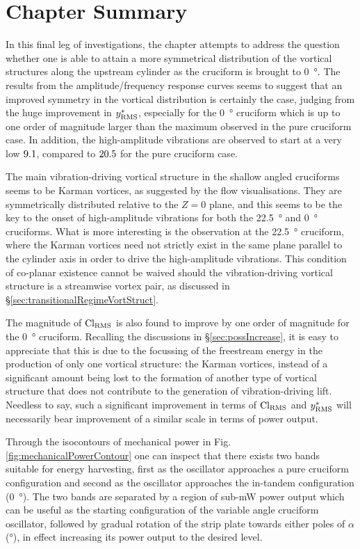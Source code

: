 \documentclass[oneside]{utmthesis}
\begin{document}
\section{Chapter Summary} \label{sec:chapSumShallow}
In this final leg of investigations, the chapter attempts to address the question whether one is able to attain a more symmetrical distribution of the vortical structures along the upstream cylinder as the cruciform is brought to \SI{0}{\degree}. The results from the amplitude/frequency response curves seems to suggest that an improved symmetry in the vortical distribution is certainly the case, judging from the huge improvement in $y^{*}_{\text{RMS}}$, especially for the \SI{0}{\degree} cruciform which is up to one order of magnitude larger than the maximum observed in the pure cruciform case. In addition, the high-amplitude vibrations are observed to start at a very low $9.1$, compared to $20.5$ for the pure cruciform case.

The main vibration-driving vortical structure in the shallow angled cruciforms seems to be Karman vortices, as suggested by the flow visualisations. They are symmetrically distributed relative to the $Z=0$ plane, and this seems to be the key to the onset of high-amplitude vibrations for both the \SI{22.5}{\degree} and \SI{0}{\degree} cruciforms. What is more interesting is the observation at the \SI{22.5}{\degree} cruciform, where the Karman vortices need not strictly exist in the same plane parallel to the cylinder axis in order to drive the high-amplitude vibrations. This condition of co-planar existence cannot be waived should the vibration-driving vortical structure is a streamwise vortex pair, as discussed in \S\ref{sec:transitionalRegimeVortStruct}.

The magnitude of $\text{Cl}_{\text{RMS}}$ is also found to improve by one order of magnitude for the \SI{0}{\degree} cruciform. Recalling the discussions in \S\ref{sec:possIncrease}, it is easy to appreciate that this is due to the focussing of the freestream energy in the production of only one vortical structure: the Karman vortices, instead of a significant amount being lost to the formation of another type of vortical structure that does not contribute to the generation of vibration-driving lift. Needless to say, such a significant improvement in terms of $\text{Cl}_{\text{RMS}}$ and $y^{*}_{\text{RMS}}$ will necessarily bear improvement of a similar scale in terms of power output.

Through the isocontours of mechanical power in Fig. \ref{fig:mechanicalPowerContour} one can inspect that there exists two bands suitable for energy harvesting, first as the oscillator approaches a pure cruciform configuration and second as the oscillator approaches the in-tandem configuration (\SI{0}{\degree}). The two bands are separated by a region of sub-mW power output which can be useful as the starting configuration of the variable angle cruciform oscillator, followed by gradual rotation of the strip plate towards either poles of $\alpha$ (\si{\degree}), in effect increasing its power output to the desired level.
\end{document}
